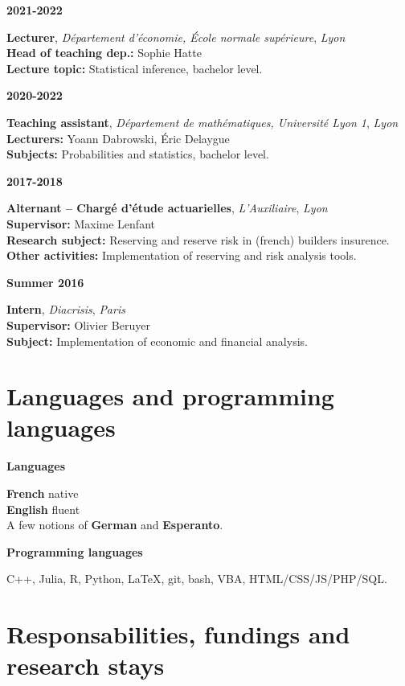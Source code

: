 \documentclass[a4paper,11pt]{article}
\newcommand{\tabcv}[2]{
\begin{minipage}[t]{0.12\linewidth}
\textbf{\footnotesize #1}
\end{minipage}\hfill
\begin{minipage}[t]{0.85\linewidth}
#2
\end{minipage}
\vspace{1em}
}
\newcommand{\bull}[1]{\textbf{#1}}
\begin{document}
\tabcv{2021-2022}{
\textbf{Lecturer}, \textit{Département d'économie, École normale supérieure}, \textit{Lyon}\\[0.5em]
{\footnotesize
  \bull{Head of teaching dep.:} Sophie Hatte\\
  \bull{Lecture topic:} Statistical inference, bachelor level.\\
}
}

\tabcv{2020-2022}{
\textbf{Teaching assistant}, \textit{Département de mathématiques, Université Lyon 1}, \textit{Lyon}\\[0.5em]
{\footnotesize
  \bull{Lecturers:} Yoann Dabrowski, Éric Delaygue\\
  \bull{Subjects:} Probabilities and statistics, bachelor level.\\
}
}

\tabcv{2017-2018}{
\textbf{Alternant -- Chargé d'étude actuarielles}, \textit{L'Auxiliaire}, \textit{Lyon}\\[0.5em]
{\footnotesize
  \bull{Supervisor:} Maxime Lenfant\\
  \bull{Research subject:} Reserving and reserve risk in (french) builders insurence.\\
  \bull{Other activities:} Implementation of reserving and risk analysis tools.\\
}
}


\tabcv{Summer 2016}{
\textbf{Intern}, \textit{Diacrisis}, \textit{Paris}\\[0.5em]
{\footnotesize
  \bull{Supervisor:} Olivier Beruyer\\
  \bull{Subject:} Implementation of economic and financial analysis. \\
}
}

\section{Languages and programming languages}
\tabcv{Languages}{
  \textbf{French} native\\ 
  \textbf{English} fluent\\ 
  A few notions of \textbf{German} and \textbf{Esperanto}.\\
}
\tabcv{Programming languages}{C++, Julia, R, Python, \LaTeX, git, bash, VBA, HTML/CSS/JS/PHP/SQL.}

\section{Responsabilities, fundings and research stays}
\end{document}
